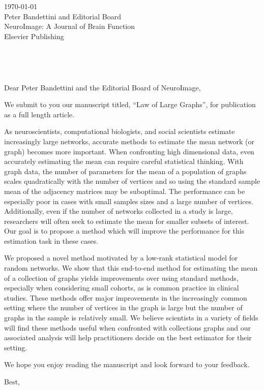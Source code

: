 \documentclass[11pt]{letter} %
\def\opening#1{\thispagestyle{empty}
{\centering\fromaddress \vspace{0.75in} \\ %
} %
{\raggedright \toname \\ \toaddress \par} %
\vspace{0.3in} %
\noindent #1 %
}
\begin{document}
\begin{letter}{%
\today\\
\vspace{11pt}
Peter Bandettini and Editorial Board \\
NeuroImage: A Journal of Brain Function \\
Elsevier Publishing
}


\opening{Dear Peter Bandettini and the Editorial Board of NeuroImage,}

We submit to you our manuscript titled, ``Law of Large Graphs'', for publication as a full length article.

As neuroscientists, computational biologists, and social scientists estimate increasingly large networks, accurate methods to estimate the mean network (or graph) becomes more important. When confronting high dimensional data, even accurately estimating the mean can require careful statistical thinking. With graph data, the number of parameters for the mean of a population of graphs scales quadratically with the number of vertices and so using the standard sample mean of the adjacency matrices may be suboptimal. The performance can be especially poor in cases with small samples sizes and a large number of vertices. Additionally, even if the number of networks collected in a study is large, researchers will often seek to estimate the mean for smaller subsets of interest. Our goal is to propose a method which will improve the performance for this estimation task in these cases.

We proposed a novel method motivated by a low-rank statistical model for random networks. We show that this end-to-end method for estimating the mean of a collection of graphs yields improvements over using standard methods, especially when considering small cohorts, as is common practice in clinical studies. These methods offer major improvements in the increasingly common setting where the number of vertices in the graph is large but the number of graphs in the sample is relatively small. We believe scientists in a variety of fields will find these methods useful when confronted with collections graphs and our associated analysis will help practitioners decide on the best estimator for their setting. 


We hope you enjoy reading the manuscript and look forward to your feedback.

\closing{Best,}


\end{letter}
\end{document}
